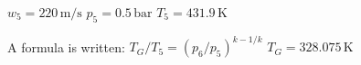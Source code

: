 \( w_5 = 220 \, \text{m/s} \)  
\( p_5 = 0.5 \, \text{bar} \)  
\( T_5 = 431.9 \, \text{K} \)  

A formula is written:  
\( T_G / T_5 = (p_6 / p_5)^{k-1/k} \)  
\( T_G = 328.075 \, \text{K} \)